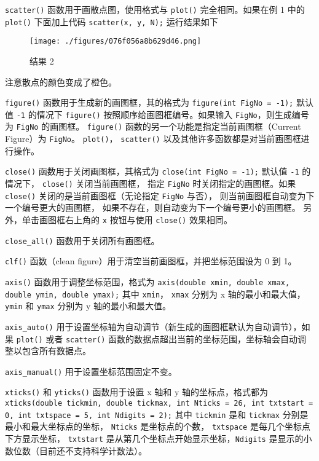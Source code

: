 \verb|scatter()| 函数用于画散点图，使用格式与 \verb|plot()| 完全相同。如果在例 1 中的 \verb|plot()| 下面加上代码
\verb|scatter(x, y, N);|
运行结果如下

\begin{figure}[ht]
\centering
\texttt{[image: ./figures/076f056a8b629d46.png]}
\caption{结果 2} \label{fig_MtPlot_4}
\end{figure}

注意散点的颜色变成了橙色。

\verb|figure()| 函数用于生成新的画图框，其的格式为
\verb|figure(int FigNo = -1);|
默认值 \verb|-1| 的情况下 \verb|figure()| 按照顺序给画图框编号。如果输入 \verb|FigNo|，则生成编号为 \verb|FigNo| 的画图框。 \verb|figure()| 函数的另一个功能是指定当前画图框（Current Figure）为 \verb|FigNo|。 \verb|plot()|， \verb|scatter()| 以及其他许多函数都是对当前画图框进行操作。

\verb|close()| 函数用于关闭画图框，其格式为
\verb|close(int FigNo = -1);|
默认值 \verb|-1| 的情况下， \verb|close()| 关闭当前画图框， 指定 \verb|FigNo| 时关闭指定的画图框。如果 \verb|close()| 关闭的是当前画图框（无论指定 \verb|FigNo| 与否）， 则当前画图框自动变为下一个编号更大的画图框， 如果不存在，则自动变为下一个编号更小的画图框。 另外，单击画图框右上角的 \verb|x| 按钮与使用 \verb|close()| 效果相同。

\verb|close_all()| 函数用于关闭所有画图框。

\verb|clf()| 函数（clean figure）用于清空当前画图框，并把坐标范围设为 0 到 1。

\verb|axis()| 函数用于调整坐标范围，格式为
\verb|axis(double xmin, double xmax, double ymin, double ymax);|
其中 \verb|xmin|， \verb|xmax| 分别为 x 轴的最小和最大值， \verb|ymin| 和 \verb|ymax| 分别为 y 轴的最小和最大值。

\verb|axis_auto()| 用于设置坐标轴为自动调节（新生成的画图框默认为自动调节），如果 \verb|plot()| 或者 \verb|scatter()| 函数的数据点超出当前的坐标范围，坐标轴会自动调整以包含所有数据点。

\verb|axis_manual()| 用于设置坐标范围固定不变。

\verb|xticks()| 和 \verb|yticks()| 函数用于设置 x 轴和 y 轴的坐标点，格式都为
\verb|xticks(double tickmin, double tickmax, int Nticks = 26, int txtstart = 0, int txtspace = 5, int Ndigits = 2);|
其中 \verb|tickmin| 是和 \verb|tickmax| 分别是最小和最大坐标点的坐标， \verb|Nticks| 是坐标点的个数， \verb|txtspace| 是每几个坐标点下方显示坐标， \verb|txtstart| 是从第几个坐标点开始显示坐标，\verb|Ndigits| 是显示的小数位数（目前还不支持科学计数法）。

